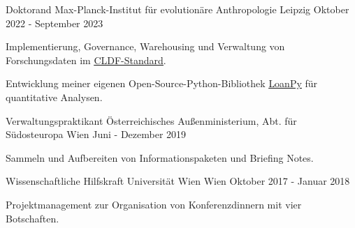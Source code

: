 \begin{cventries}

  \cventry
    {Doktorand} %
    {Max-Planck-Institut für evolutionäre Anthropologie} %
    {Leipzig} %
    {Oktober 2022 - September 2023} %
    {
      \begin{cvitems} %
      \item{Implementierung, Governance, Warehousing und Verwaltung von Forschungsdaten im \underline{\href{https://cldf.clld.org/}{CLDF-Standard}}.}
      \item{Entwicklung meiner eigenen Open-Source-Python-Bibliothek \underline{\href{https://pypi.org/project/loanpy/}{LoanPy}} für quantitative Analysen.}
      \end{cvitems}
    }
    
  \cventry
    {Verwaltungspraktikant} %
    {Österreichisches Außenministerium, Abt. für Südosteuropa} %
    {Wien} %
    {Juni - Dezember 2019} %
    {
      \begin{cvitems} %
        \item{Sammeln und Aufbereiten von Informationspaketen und Briefing Notes.}
      \end{cvitems}
    }

  \cventry
    {Wissenschaftliche Hilfskraft} %
    {Universität Wien} %
    {Wien} %
    {Oktober 2017 - Januar 2018} %
    {
    \begin{cvitems}
    \item{Projektmanagement zur Organisation von Konferenzdinnern mit vier Botschaften.}
    \end{cvitems}
    }
    

        
\end{cventries}
